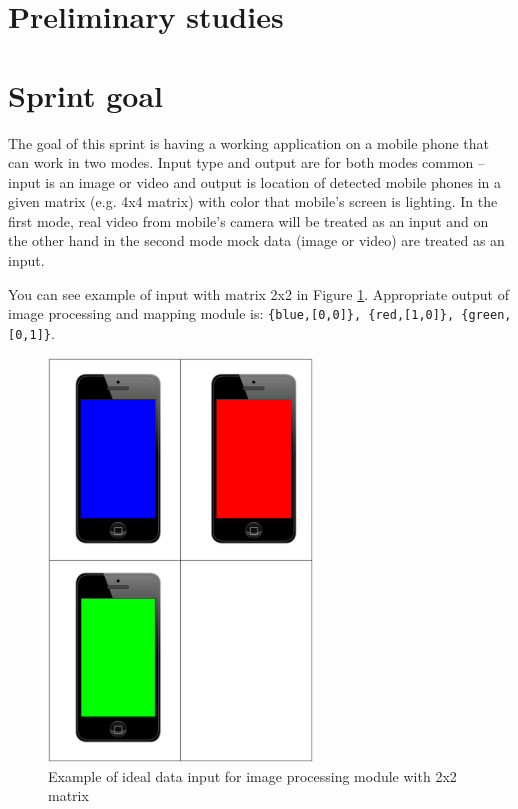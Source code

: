 \section{Preliminary studies}

\section{Sprint goal}
The goal of this sprint is having a working application on a mobile phone that can work in two modes.  
Input type and output are for both modes common -- input is an image or video and output is location of detected mobile phones in a given matrix (e.g. 4x4 matrix) with color that mobile's screen is lighting.
In the first mode, real video from mobile's camera will be treated as an input and on the other hand in the second mode mock data (image or video) are treated as an input.

You can see example of input with matrix 2x2 in Figure \ref{img:sprint3_goal}. Appropriate output of image processing and mapping module is: \texttt{\{blue,[0,0]\}, \{red,[1,0]\}, \{green,[0,1]\}}.

\begin{figure}[H]
	\centering
		\includegraphics[width=7cm]{sprint3/sprint3_goal.pdf}
	\caption{Example of ideal data input for image processing module with 2x2 matrix}
	\label{img:sprint3_goal}
\end{figure}

